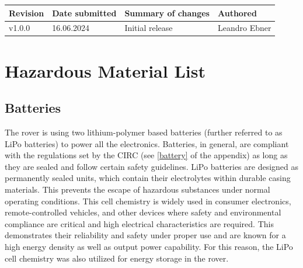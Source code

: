     \begin{table}[b]
        \centering
        \begin{tabular}{|l|l|l|l|} \hline 
             Revision&  Date submitted& Summary of changes  &Authored \\ \hline 
             v1.0.0&  16.06.2024& Initial release  &Leandro Ebner \\ \hline
        \end{tabular}
    \end{table}

    \clearpage      
    
\section{Hazardous Material List}

    \subsection{Batteries}
    
    The rover is using two lithium-polymer based batteries (further referred to as LiPo batteries) to power all the electronics. Batteries, in general, are compliant with the regulations set by the CIRC (see \ref{battery} of the appendix) as long as they are sealed and follow certain safety guidelines. LiPo batteries are designed as permanently sealed units, which contain their electrolytes within durable casing materials. This prevents the escape of hazardous substances under normal operating conditions. This cell chemistry is widely used in consumer electronics, remote-controlled vehicles, and other devices where safety and environmental compliance are critical and high electrical characteristics are required. This demonstrates their reliability and safety under proper use and are known for a high energy density as well as output power capability. For this reason, the LiPo cell chemistry was also utilized for energy storage in the rover.
    
    \vspace{5mm}
    
